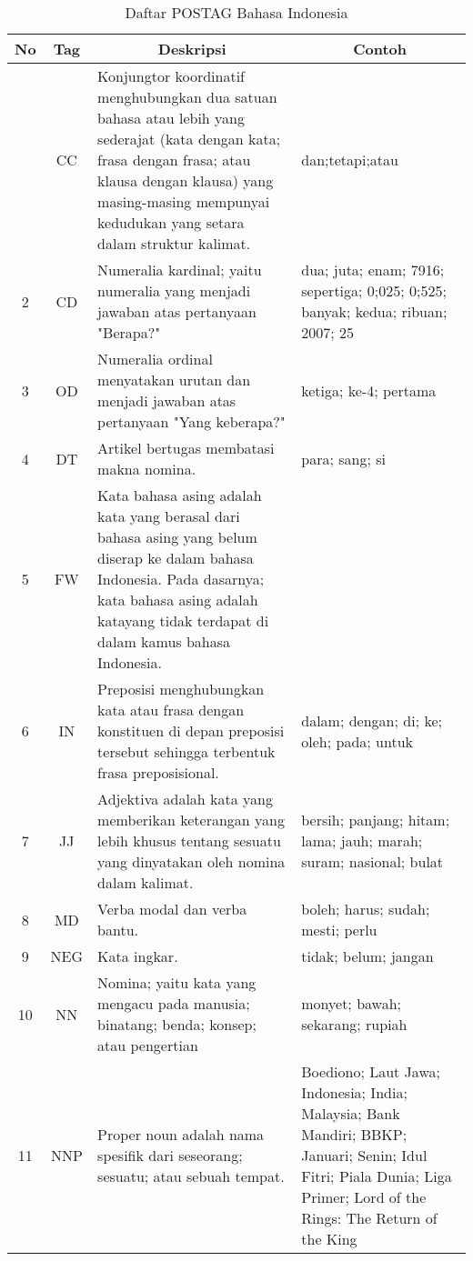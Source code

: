 
\begin{longtable}{|c|c|p{}|p{}|}
	\caption{Daftar POSTAG Bahasa Indonesia}\label{lampiran:postag}
	\hline
	\multicolumn{1}{|c|}{\textbf{No}} & \multicolumn{1}{c|}{\textbf{Tag}} & \multicolumn{1}{c|}{\textbf{Deskripsi}} & \multicolumn{1}{c|}{Contoh} \\
	\hline
	\endhead
	\hline
	\endfoot
	1 & CC & Konjungtor koordinatif menghubungkan dua satuan bahasa atau lebih yang sederajat (kata dengan kata; frasa dengan frasa; atau klausa dengan klausa) yang masing-masing mempunyai kedudukan yang setara dalam struktur kalimat. & dan;tetapi;atau \\ \hline
	2 & CD & Numeralia kardinal; yaitu numeralia yang menjadi jawaban atas pertanyaan "Berapa?" & dua; juta; enam; 7916; sepertiga; 0;025; 0;525; banyak; kedua; ribuan; 2007; 25 \\ \hline
	3 & OD & Numeralia ordinal menyatakan urutan dan menjadi jawaban atas pertanyaan "Yang keberapa?" & ketiga; ke-4; pertama \\ \hline
	4 & DT & Artikel bertugas membatasi makna nomina. & para; sang; si \\ \hline
	5 & FW & Kata bahasa asing adalah kata yang berasal dari bahasa asing yang belum diserap ke dalam bahasa Indonesia. Pada dasarnya; kata bahasa asing adalah katayang tidak terdapat di dalam kamus bahasa Indonesia. &  \\ \hline
	6 & IN & Preposisi menghubungkan kata atau frasa dengan konstituen di depan preposisi tersebut sehingga terbentuk frasa preposisional. & dalam; dengan; di; ke; oleh; pada; untuk \\ \hline
	7 & JJ & Adjektiva adalah kata yang memberikan keterangan yang lebih khusus tentang sesuatu yang dinyatakan oleh nomina dalam kalimat. & bersih; panjang; hitam; lama; jauh; marah; suram; nasional; bulat \\ \hline
	8 & MD & Verba modal dan verba bantu. & boleh; harus; sudah; mesti; perlu \\ \hline
	9 & NEG & Kata ingkar. & tidak; belum; jangan \\ \hline
	10 & NN & Nomina; yaitu kata yang mengacu pada manusia; binatang; benda; konsep; atau pengertian & monyet; bawah; sekarang; rupiah \\ \hline
	11 & NNP & Proper noun adalah nama spesifik dari seseorang; sesuatu; atau sebuah tempat. & Boediono; Laut Jawa; Indonesia; India; Malaysia; Bank Mandiri; BBKP; Januari; Senin; Idul Fitri; Piala Dunia; Liga Primer; Lord of the Rings: The Return of the King \\ \hline

\end{longtable}
